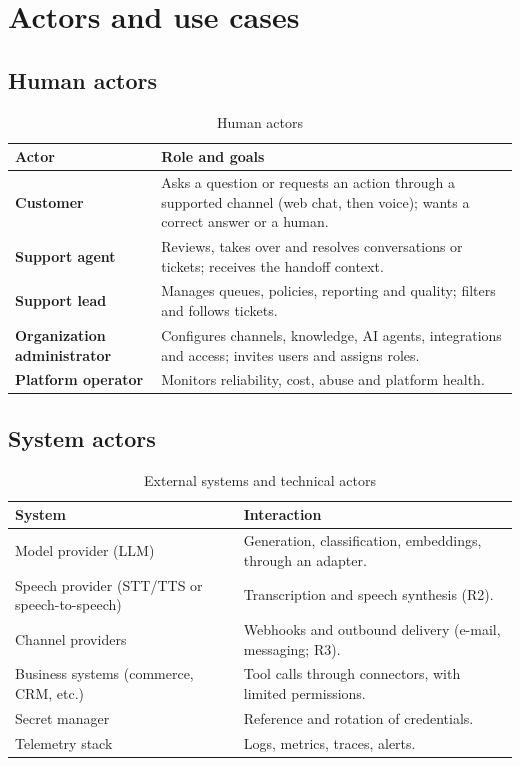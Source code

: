\chapter{Actors and use cases}

\section{Human actors}
\begin{table}[htbp]
\centering\caption{Human actors}\label{tab:actors}
\begin{tabular}{@{}p{3.8cm}p{12.2cm}@{}}
\toprule \textbf{Actor} & \textbf{Role and goals} \\ \midrule
\textbf{Customer} & Asks a question or requests an action through a supported channel (web chat, then voice); wants a correct answer or a human. \\
\textbf{Support agent} & Reviews, takes over and resolves conversations or tickets; receives the handoff context. \\
\textbf{Support lead} & Manages queues, policies, reporting and quality; filters and follows tickets. \\
\textbf{Organization administrator} & Configures channels, knowledge, AI agents, integrations and access; invites users and assigns roles. \\
\textbf{Platform operator} & Monitors reliability, cost, abuse and platform health. \\
\bottomrule
\end{tabular}
\end{table}

\section{System actors}
\begin{table}[htbp]
\centering\caption{External systems and technical actors}\label{tab:systems}
\begin{tabular}{@{}p{4.6cm}p{11.4cm}@{}}
\toprule \textbf{System} & \textbf{Interaction} \\ \midrule
Model provider (LLM) & Generation, classification, embeddings, through an adapter. \\
Speech provider (STT/TTS or speech-to-speech) & Transcription and speech synthesis (R2). \\
Channel providers & Webhooks and outbound delivery (e-mail, messaging; R3). \\
Business systems (commerce, CRM, etc.) & Tool calls through connectors, with limited permissions. \\
Secret manager & Reference and rotation of credentials. \\
Telemetry stack & Logs, metrics, traces, alerts. \\
\bottomrule
\end{tabular}
\end{table}

